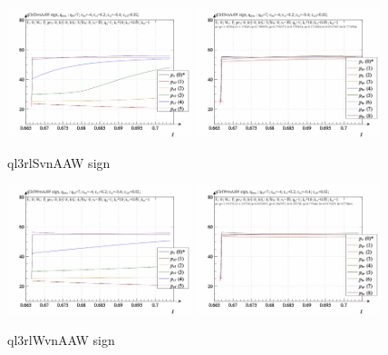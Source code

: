 \documentclass[a4paper,10pt]{article}
\begin{document}
\begin{figure}[htb!]
  \centerline{
    \includegraphics[width=0.48\textwidth]{qls-p_t_pi_m_ql3rlSvnAAW_sign.png}
    \hfill
    \includegraphics[width=0.48\textwidth]{qls-p_t_p_m_ql3rlSvnAAW_sign.png}
  }
  \caption{ql3rlSvnAAW sign}
  \label{atu:fig7}
\end{figure}


\begin{figure}[htb!]
  \centerline{
    \includegraphics[width=0.48\textwidth]{qls-p_t_pi_m_ql3rlWvnAAW_sign.png}
    \hfill
    \includegraphics[width=0.48\textwidth]{qls-p_t_p_m_ql3rlWvnAAW_sign.png}
  }
  \caption{ql3rlWvnAAW sign}
  \label{atu:fig8}
\end{figure}
\end{document}
